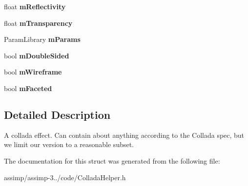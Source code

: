 \begin{DoxyCompactItemize}
\item 
\hypertarget{struct_assimp_1_1_collada_1_1_effect_adf88ef59828a593e1570230ab42e3644}{float {\bfseries m\+Reflectivity}}\label{struct_assimp_1_1_collada_1_1_effect_adf88ef59828a593e1570230ab42e3644}

\item 
\hypertarget{struct_assimp_1_1_collada_1_1_effect_a3602cee9a3606c541a1e8e5bdef94c44}{float {\bfseries m\+Transparency}}\label{struct_assimp_1_1_collada_1_1_effect_a3602cee9a3606c541a1e8e5bdef94c44}

\item 
\hypertarget{struct_assimp_1_1_collada_1_1_effect_a4531025dab8bddece4a008e8891e425e}{Param\+Library {\bfseries m\+Params}}\label{struct_assimp_1_1_collada_1_1_effect_a4531025dab8bddece4a008e8891e425e}

\item 
\hypertarget{struct_assimp_1_1_collada_1_1_effect_ae8aa422efba497e8354f8379de278671}{bool {\bfseries m\+Double\+Sided}}\label{struct_assimp_1_1_collada_1_1_effect_ae8aa422efba497e8354f8379de278671}

\item 
\hypertarget{struct_assimp_1_1_collada_1_1_effect_adbfcb0b7f161d7cade08173a13529a2d}{bool {\bfseries m\+Wireframe}}\label{struct_assimp_1_1_collada_1_1_effect_adbfcb0b7f161d7cade08173a13529a2d}

\item 
\hypertarget{struct_assimp_1_1_collada_1_1_effect_a0f149d3f1f15734c1e7870c136c77677}{bool {\bfseries m\+Faceted}}\label{struct_assimp_1_1_collada_1_1_effect_a0f149d3f1f15734c1e7870c136c77677}

\end{DoxyCompactItemize}


\subsection{Detailed Description}
A collada effect. Can contain about anything according to the Collada spec, but we limit our version to a reasonable subset. 

The documentation for this struct was generated from the following file\+:\begin{DoxyCompactItemize}
\item 
assimp/assimp-\/3../code/Collada\+Helper.\+h\end{DoxyCompactItemize}
